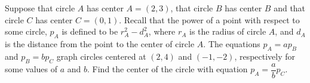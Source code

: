 Suppose that circle $A$ has center $A = (2, 3)$, that circle $B$ has center $B$ and that circle $C$ has center $C = (0, 1)$. Recall that the power of a point  with respect to some circle, $p_A$ is defined to be $r^2_A - d^2_A$, where $r_A$ is the radius of circle $A$, and $d_A$ is the distance from the point to the center of circle $A$. The equations $p_A = ap_B$ and $p_B = bp_C$ graph circles centered at $(2, 4)$ and $(-1,-2)$, respectively for some values of $a$ and $b$. Find the center of the circle with equation $p_A =\dfrac{a}{b}p_C$.
